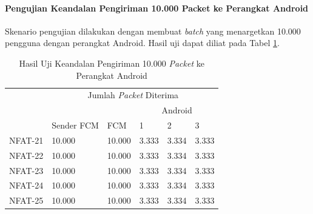 \paragraph{Pengujian Keandalan Pengiriman 10.000 Packet ke Perangkat Android}
\par Skenario pengujian dilakukan dengan membuat \textit{batch} yang menargetkan 10.000 pengguna dengan perangkat Android. Hasil uji dapat diliat pada Tabel \ref{t:keandalan-android-10k}.
\begin{longtable}{|p{1.5cm}|p{2cm}|p{1.5cm}|p{1cm}|p{1cm}|p{1cm}|}
	\caption{Hasil Uji Keandalan Pengiriman 10.000 \textit{Packet} ke Perangkat Android} \label{t:keandalan-android-10k} \\ \hline
	\rowcolor{lightgray} & \multicolumn{5}{c|}{Jumlah \textit{Packet} Diterima} \\ \hhline{~|*5{-}|}
	\rowcolor{lightgray} & & & \multicolumn{3}{c|}{Android} \\ \hhline{~~~|*3{-}|}
	\rowcolor{lightgray} \multirow{-3}{*}{Kode} & \multirow{-2}{*}{Sender FCM} & \multirow{-2}{*}{FCM} & 1 & 2 & 3 \\ \hline
	NFAT-21 & 10.000 & 10.000 & 3.333 & 3.334 & 3.333 \\ \hline
	NFAT-22 & 10.000 & 10.000 & 3.333 & 3.334 & 3.333 \\ \hline
	NFAT-23 & 10.000 & 10.000 & 3.333 & 3.334 & 3.333 \\ \hline
	NFAT-24 & 10.000 & 10.000 & 3.333 & 3.334 & 3.333 \\ \hline
	NFAT-25 & 10.000 & 10.000 & 3.333 & 3.334 & 3.333 \\ \hline
\end{longtable}

